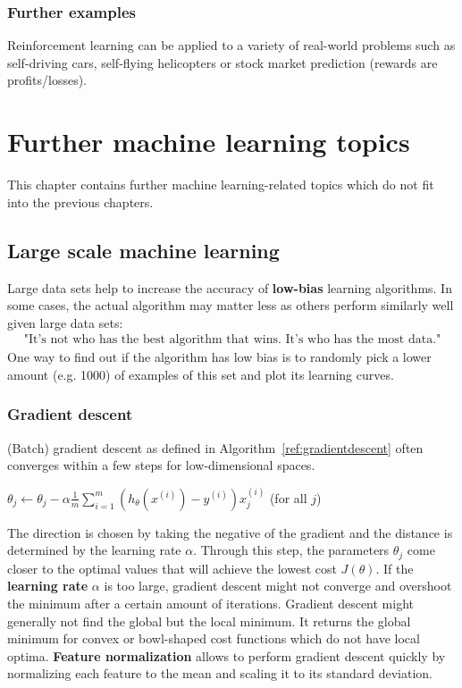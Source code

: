 \documentclass{report}
\begin{document}
\subsection{Further examples}
Reinforcement learning can be applied to a variety of real-world problems such as self-driving cars, self-flying helicopters or stock market prediction (rewards are profits/losses).


\chapter{Further machine learning topics}
This chapter contains further machine learning-related topics which do not fit into the previous chapters.

\section{Large scale machine learning}
Large data sets  help to increase the accuracy of {\bf low-bias} learning algorithms. In some cases, the actual algorithm may matter less as others perform similarly well given large data sets:
\begin{align*}
\mbox{"It's not who has the best algorithm that wins. It's who has the most data."}
\end{align*}
One way to find out if the algorithm has low bias is to randomly pick a lower amount (e.g. 1000) of  examples of this set and plot its learning curves.

\subsection{Gradient descent}
\label{chapter:gradientdescent}
(Batch) gradient descent as defined in Algorithm~\ref{ref:gradientdescent} often converges within a few steps for low-dimensional spaces.

\begin{algorithm}
\caption{Batch gradient descent}
\label{ref:gradientdescent}
\begin{algorithmic}
\Repeat
{}
\State $\theta_j  \gets \theta_j - \alpha\frac{1}{m}\sum_{i=1}^m (h_\theta(x^{(i)})-y^{(i)})x_j^{(i)}$ (for all $j$)
\EndFor
{}
\end{algorithmic}
\end{algorithm}

The direction is chosen by taking the negative of the gradient and the distance is determined by the learning rate $\alpha$.
Through this step, the parameters $\theta_j$ come closer to the optimal values that will achieve the lowest cost $J(\theta)$.
If the {\bf learning rate} $\alpha$ is too large, gradient descent might not converge and overshoot the minimum after a certain amount of iterations.
Gradient descent might generally not find the global but the local minimum.
It returns the global minimum for convex or bowl-shaped cost functions which do not have local optima.
{\bf Feature normalization} allows to perform gradient descent quickly by normalizing each feature to the mean and scaling it to its standard deviation.
\end{document}
